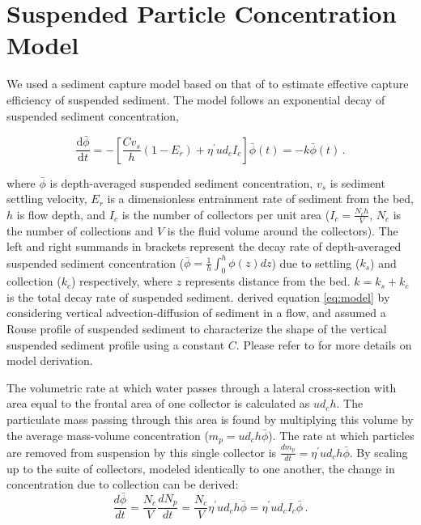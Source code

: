 \documentclass{scrreprt}
\begin{document}
\section{Suspended Particle Concentration Model}

We used a sediment capture model based on that of \cite{Fauria_2015} to estimate effective capture efficiency of suspended sediment. The model follows an exponential decay of suspended sediment concentration,

\begin{equation}
    \frac{\mathrm{d}\bar{\phi}}{\mathrm{d}t} = -\left[\frac{Cv_s}{h}(1-E_r) + \eta^{\prime}ud_cI_c\right]\bar{\phi}(t) = -k\bar{\phi}(t)\,.
    \label{eq:model}    
\end{equation}

\noindent where $\bar{\phi}$ is depth-averaged suspended sediment concentration, $v_s$ is sediment settling velocity, $E_r$ is a dimensionless entrainment rate of sediment from the bed, $h$ is flow depth, and $I_c$ is the number of collectors per unit area ($I_c=\frac{N_c h}{V}$, $N_c$ is the number of collections and $V$ is the fluid volume around the collectors). The left and right summands in brackets represent the decay rate of depth-averaged suspended sediment concentration ($\bar{\phi} = \frac{1}{h} \int_0^h\phi(z)dz$) due to settling ($k_s$) and collection ($k_c$) respectively, where $z$ represents distance from the bed. $k = k_s + k_c$ is the total decay rate of suspended sediment. \cite{Fauria_2015} derived equation \eqref{eq:model} by considering vertical advection-diffusion of sediment in a flow, and assumed a Rouse profile of suspended sediment to characterize the shape of the vertical suspended sediment profile using a constant $C$. Please refer to \cite{Fauria_2015} for more details on model derivation.

The volumetric rate at which water passes through a lateral cross-section with area equal to the frontal area of one collector is calculated as $ud_ch$. The particulate mass passing through this area is found by multiplying this volume by the average mass-volume concentration ($m_p = ud_ch\bar{\phi}$). The rate at which particles are removed from suspension by this single collector is $\frac{dm_p}{dt}=\eta^{\prime}ud_ch\bar{\phi}$. By scaling up to the suite of collectors, modeled identically to one another, the change in concentration due to collection can be derived:
\begin{equation}
\frac{d\bar{\phi}}{dt} = \frac{N_c}{V}\frac{dN_p}{dt} = \frac{N_c}{V}\eta^{\prime}ud_ch\bar{\phi} = \eta^{\prime}ud_cI_c\bar{\phi}\,.
\label{eq:collection}
\end{equation}
\end{document}
